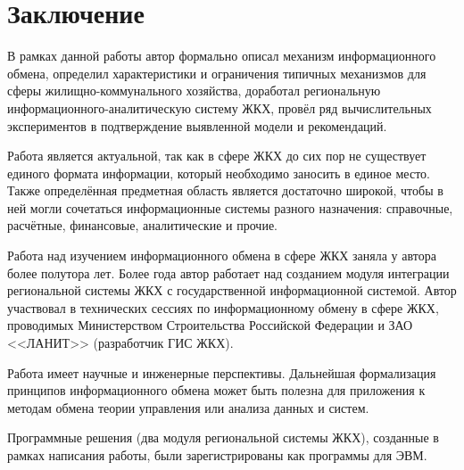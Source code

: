 \section*{Заключение}

В рамках данной работы автор формально описал механизм информационного обмена, определил характеристики и ограничения типичных механизмов для сферы жилищно-коммунального хозяйства, доработал региональную информационного-аналитическую систему ЖКХ, провёл ряд вычислительных экспериментов в подтверждение выявленной модели и рекомендаций.

Работа является актуальной, так как в сфере ЖКХ до сих пор не существует единого формата информации, который необходимо заносить в единое место.
Также определённая предметная область является достаточно широкой, чтобы в ней могли сочетаться информационные системы разного назначения: справочные, расчётные, финансовые, аналитические и прочие.

Работа над изучением информационного обмена в сфере ЖКХ заняла у автора более полутора лет.
Более года автор работает над созданием модуля интеграции региональной системы ЖКХ с государственной информационной системой.
Автор участвовал в технических сессиях по информационному обмену в сфере ЖКХ, проводимых Министерством Строительства Российской Федерации и ЗАО <<ЛАНИТ>> (разработчик ГИС ЖКХ).

Работа имеет научные и инженерные перспективы.
Дальнейшая формализация принципов информационного обмена может быть полезна для приложения к методам обмена теории управления или анализа данных и систем.

Программные решения (два модуля региональной системы ЖКХ), созданные в рамках написания работы, были зарегистрированы как программы для ЭВМ.

\clearpage
\newpage